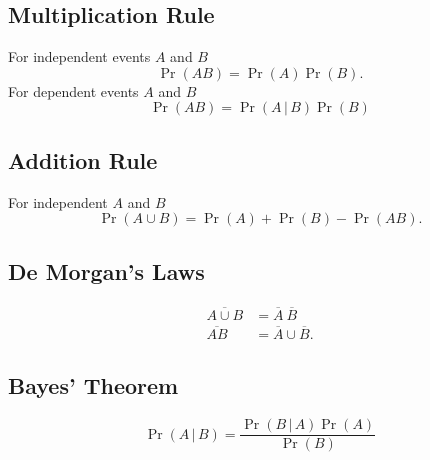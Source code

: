 \documentclass{article}
\begin{document}
\begin{multicols}{3}
    \subsection{Multiplication Rule}
    For independent events \(A\) and \(B\)
    \begin{equation*}
        \Pr{\left( AB \right)} = \Pr{\left( A \right)} \Pr{\left( B \right)}.
    \end{equation*}
    For dependent events \(A\) and \(B\)
    \begin{equation*}
        \Pr{\left( AB \right)} = \Pr{\left( A \,\vert \, B \right)} \Pr{\left( B \right)}
    \end{equation*}
    \subsection{Addition Rule}
    For independent \(A\) and \(B\)
    \begin{equation*}
        \Pr{\left( A \cup B \right)} = \Pr{\left( A \right)} + \Pr{\left( B \right)} - \Pr{\left( AB \right)}.
    \end{equation*}
    \subsection{De Morgan's Laws}
    \begin{align*}
        \overline{A \cup B} & = \overline{A} \ \overline{B}     \\
        \overline{AB}       & = \overline{A} \cup \overline{B}.
    \end{align*}
    \subsection{Bayes' Theorem}
    \begin{equation*}
        \Pr{\left( A \,\vert\, B \right)} = \frac{\Pr{\left( B \,\vert\, A \right)}\Pr{\left( A \right)}}{\Pr{\left( B \right)}}
    \end{equation*}

\end{multicols}
\end{document}
